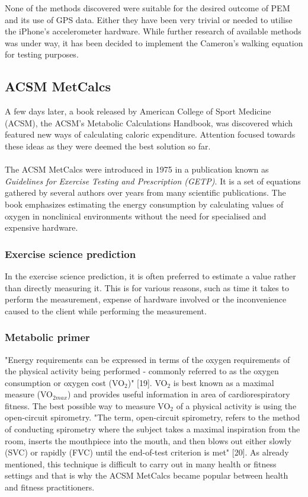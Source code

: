 \documentclass[12pt, a4paper]{report}   %
\begin{document}
\begin{enumerate}
None of the methods discovered were suitable for the desired outcome of PEM and its use of GPS data. Either they have been very trivial or needed to utilise the iPhone's accelerometer hardware. While further research of available methods was under way, it has been decided to implement the Cameron's walking equation for testing purposes.

\clearpage
\subsection{ACSM MetCalcs}
A few days later, a book released by American College of Sport Medicine (ACSM), the ACSM's Metabolic Calculations Handbook, was discovered which featured new ways of calculating caloric expenditure. Attention focused towards these ideas as they were deemed the best solution so far.
\\ \\
The ACSM MetCalcs were introduced in 1975 in a publication known as \textit{Guidelines for Exercise Testing and Prescription (GETP)}. It is a set of equations gathered by several authors over years from many scientific publications. The book emphasizes estimating the energy consumption by calculating values of oxygen in nonclinical environments without the need for specialised and expensive hardware.

\subsubsection{Exercise science prediction}
In the exercise science prediction, it is often preferred to estimate a value rather than directly measuring it. This is for various reasons, such as time it takes to perform the measurement, expense of hardware involved or the inconvenience caused to the client while performing the measurement.

\subsubsection{Metabolic primer}
"Energy requirements can be expressed in terms of the oxygen requirements of the physical activity being performed - commonly referred to as the oxygen consumption or oxygen cost (VO$_{2}$)" [19]. VO$_{2}$ is best known as a maximal measure (VO$_{2 max}$) and provides useful information in area of cardiorespiratory fitness. The best possible way to measure VO$_{2}$ of a physical activity is using the open-circuit spirometry. "The term, open-circuit spirometry, refers to the method of conducting spirometry where the subject takes a maximal inspiration from the room, inserts the mouthpiece into the mouth, and then blows out either slowly (SVC) or rapidly (FVC) until the end-of-test criterion is met" [20]. As already mentioned, this technique is difficult to carry out in many health or fitness settings and that is why the ACSM MetCalcs became popular between health and fitness practitioners.


\end{enumerate}
\end{document}
